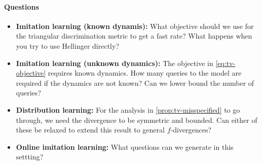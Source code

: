 \paragraph{Questions}
\begin{itemize}
  \item \textbf{Imitation learning (known dynamis):} What objective should we use for the triangular discrimination metric to get a fast rate? What happens when you try to use Hellinger directly? 
  \item \textbf{Imitation learning (unknown dynamics):} The objective in \cref{eq:tv-objective} requires known dynamics. How many queries to the model are required if the dynamics are not known? Can we lower bound the number of queries?  
  \item \textbf{Distribution learning:} 
  For the analysis in \cref{prop:tv-misspecified} to go through, we need the divergence to be symmetric and bounded. Can either of these be relaxed to extend this result to general $f$-divergences? 
  \item \textbf{Online imitation learning:} What questions can we generate in this settting? 
\end{itemize}


